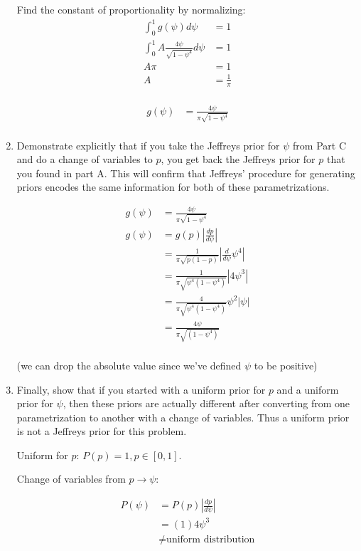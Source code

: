 \begin{enumerate}[label=\textbf{\Alph*}.]
    Find the constant of proportionality by normalizing:
    \begin{align*}
        \int_0^1 g(\psi)d\psi &= 1 \\
        \int_0^1 A \frac{4\psi}{\sqrt{1-\psi^4}} d\psi &= 1 \\
        A \pi &= 1 \\
        A &= \frac{1}{\pi} \\
    \end{align*}

    \begin{align*}
        g(\psi) &= \frac{4\psi}{\pi\sqrt{1-\psi^4}} \\
    \end{align*}

    \item Demonstrate explicitly that if you take the Jeffreys prior for $\psi$ from Part C and do a change of variables to $p$, you get back the Jeffreys prior for $p$ that you found in part A. This will confirm that Jeffreys' procedure for generating priors encodes the same information for both of these parametrizations.

    \begin{align*}
        g(\psi) &= \frac{4\psi}{\pi\sqrt{1-\psi^4}} \\
        g(\psi) &= g(p)\left|\frac{dp}{d\psi}\right| \\
        &= \frac{1}{\pi\sqrt{p(1-p)}}\left|\frac{d}{d\psi}\psi^4\right| \\
        &= \frac{1}{\pi\sqrt{\psi^4(1-\psi^4)}}\left|4\psi^3\right| \\
        &= \frac{4}{\pi\sqrt{\psi^4(1-\psi^4)}}\psi^2|\psi| \\
        &= \frac{4\psi}{\pi\sqrt{(1-\psi^4)}} \\
    \end{align*}

    (we can drop the absolute value since we've defined $\psi$ to be positive)

    \newpage
    \item Finally, show that if you started with a uniform prior for $p$ and a uniform prior for $\psi$, then these priors are actually different after converting from one parametrization to another with a change of variables. Thus a uniform prior is not a Jeffreys prior for this problem.
    
    Uniform for $p$: $P(p) = 1, p \in [0,1]$.

    Change of variables from $p \to \psi$:

    \begin{align*}
        P(\psi) &= P(p) \left|\frac{dp}{d\psi}\right| \\
        &= (1) 4\psi^3 \\
        &\neq \text{uniform distribution} \\
    \end{align*}

\end{enumerate}
